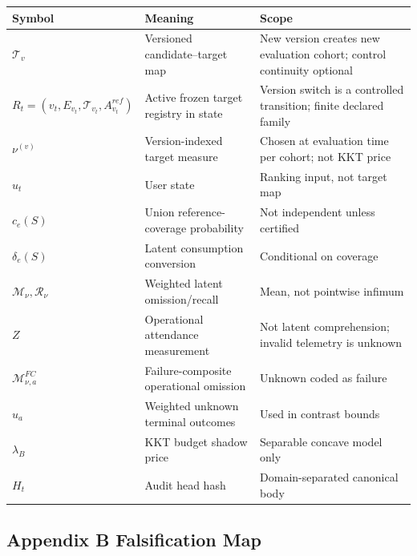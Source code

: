 \documentclass[
  11pt]{article}
\begin{document}
\begin{longtable}[]{@{}
  >{\raggedright\arraybackslash}p{}
  >{\raggedright\arraybackslash}p{}
  >{\raggedright\arraybackslash}p{}@{}}
\toprule\noalign{}
\begin{minipage}[b]{\linewidth}\raggedright
Symbol
\end{minipage} & \begin{minipage}[b]{\linewidth}\raggedright
Meaning
\end{minipage} & \begin{minipage}[b]{\linewidth}\raggedright
Scope
\end{minipage} \\
\midrule\noalign{}
\endhead
\bottomrule\noalign{}
\endlastfoot
\(\mathcal T_v\) & Versioned candidate--target map & New version creates
new evaluation cohort; control continuity optional \\
\(R_t=(v_t,E_{v_t},\mathcal T_{v_t},A^{ref}_{v_t})\) & Active frozen
target registry in state & Version switch is a controlled transition;
finite declared family \\
\(\nu^{(v)}\) & Version-indexed target measure & Chosen at evaluation
time per cohort; not KKT price \\
\(u_t\) & User state & Ranking input, not target map \\
\(c_e(S)\) & Union reference-coverage probability & Not independent
unless certified \\
\(\delta_e(S)\) & Latent consumption conversion & Conditional on
coverage \\
\(\mathcal M_\nu,\mathcal R_\nu\) & Weighted latent omission/recall &
Mean, not pointwise infimum \\
\(Z\) & Operational attendance measurement & Not latent comprehension;
invalid telemetry is unknown \\
\(\mathcal M^{FC}_{\nu,a}\) & Failure-composite operational omission &
Unknown coded as failure \\
\(u_a\) & Weighted unknown terminal outcomes & Used in contrast
bounds \\
\(\lambda_B\) & KKT budget shadow price & Separable concave model
only \\
\(H_t\) & Audit head hash & Domain-separated canonical body \\
\end{longtable}

\subsection{Appendix B Falsification
Map}\label{appendix-b-falsification-map}
\end{document}

